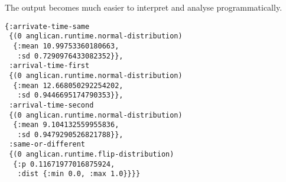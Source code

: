 The output becomes much easier to interpret and analyse
programmatically.

\begin{lstlisting}[style=default]
{:arrivate-time-same
 {(0 anglican.runtime.normal-distribution)
  {:mean 10.99753360180663,
   :sd 0.7290976433082352}},
 :arrival-time-first
 {(0 anglican.runtime.normal-distribution)
  {:mean 12.668050292254202,
   :sd 0.9446695174790353}},
 :arrival-time-second
 {(0 anglican.runtime.normal-distribution)
  {:mean 9.104132559955836,
   :sd 0.9479290526821788}},
 :same-or-different
 {(0 anglican.runtime.flip-distribution)
  {:p 0.11671977016875924,
   :dist {:min 0.0, :max 1.0}}}}
\end{lstlisting}

